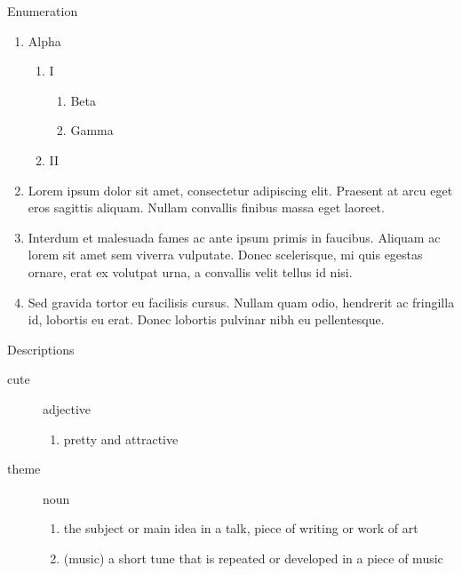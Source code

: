 \documentclass[t]{beamer}  %
\begin{document}
\begin{frame}{Enumeration}
  \begin{enumerate}
    \item Alpha
      \begin{enumerate}
        \item I
          \begin{enumerate}
            \item Beta
            \item Gamma
          \end{enumerate}
        \item II
      \end{enumerate}
    \item Lorem ipsum dolor sit amet, consectetur adipiscing elit. Praesent at arcu eget eros sagittis aliquam. Nullam convallis finibus massa eget laoreet.
    \item Interdum et malesuada fames ac ante ipsum primis in faucibus. Aliquam ac lorem sit amet sem viverra vulputate. Donec scelerisque, mi quis egestas ornare, erat ex volutpat urna, a convallis velit tellus id nisi.
    \item Sed gravida tortor eu facilisis cursus. Nullam quam odio, hendrerit ac fringilla id, lobortis eu erat. Donec lobortis pulvinar nibh eu pellentesque.
  \end{enumerate}
\end{frame}


\begin{frame}{Descriptions}
  \begin{description}
    \item[cute] adjective
      \begin{enumerate}
        \item pretty and attractive
      \end{enumerate}
    \item[theme] noun
      \begin{enumerate}
        \item the subject or main idea in a talk, piece of writing or work of art
        \item (music) a short tune that is repeated or developed in a piece of music
      \end{enumerate}
  \end{description}
\end{frame}
\end{document}
